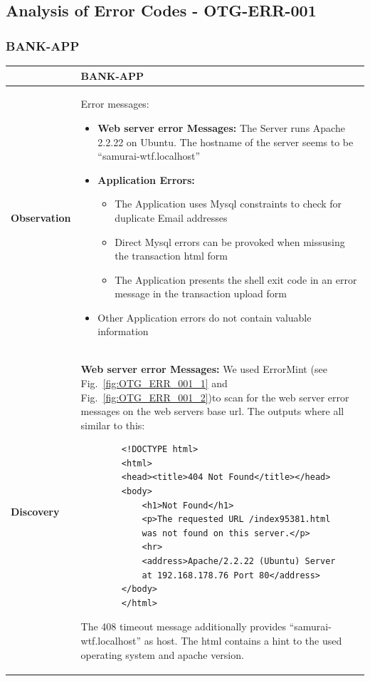 \subsection{Analysis of Error Codes - OTG-ERR-001}
\subsubsection{BANK-APP}
\begin{longtable*}{ p{.20\textwidth} | p{.75\textwidth} }\hline
    & \textbf{BANK-APP} \\ \hline
    \textbf{Observation} & 
    	Error messages:
    	\begin{itemize}
		  \item \textbf{Web server error Messages:} The Server runs Apache 2.2.22 on Ubuntu. The hostname of the server seems to be \enquote{samurai-wtf.localhost}
		  \item \textbf{Application Errors:} 
		  	\begin{itemize}
			  \item The Application uses Mysql constraints to check for duplicate Email addresses
			  \item Direct Mysql errors can be provoked when missusing the transaction html form
			  \item The Application presents the shell exit code in an error message in the transaction upload form
			\end{itemize}
		  \item Other Application errors do not contain valuable information
		\end{itemize}
    \\
    \textbf{Discovery} &
    	\textbf{Web server error Messages:}\newline
    	We used ErrorMint (see Fig.~\ref{fig:OTG_ERR_001_1} and Fig.~\ref{fig:OTG_ERR_001_2})to scan for the web server error messages on the web servers base url. The outputs where all similar to this:
    	\begin{lstlisting}
		<!DOCTYPE html>
		<html>
		<head><title>404 Not Found</title></head>
		<body>
		    <h1>Not Found</h1>
		    <p>The requested URL /index95381.html 
			was not found on this server.</p>
		    <hr>
		    <address>Apache/2.2.22 (Ubuntu) Server 
		    at 192.168.178.76 Port 80</address>
		</body>
		</html>
    	\end{lstlisting}
    	The 408 timeout message additionally provides \enquote{samurai-wtf.localhost} as host.
    	The html contains a hint to the used operating system and apache version.\newline

\end{longtable*}
